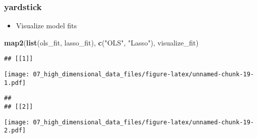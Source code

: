 \documentclass[
]{book}
\newenvironment{Shaded}{\begin{snugshade}}{\end{snugshade}}
\newcommand{\KeywordTok}[1]{\textcolor[rgb]{0.13,0.29,0.53}{\textbf{#1}}}
\newcommand{\NormalTok}[1]{#1}
\newcommand{\StringTok}[1]{\textcolor[rgb]{0.31,0.60,0.02}{#1}}
\providecommand{\tightlist}{%
  \setlength{\itemsep}{0pt}\setlength{\parskip}{0pt}}
\begin{document}
\hypertarget{yardstick}{%
\subsubsection{yardstick}\label{yardstick}}

\begin{itemize}
\tightlist
\item
  Visualize model fits
\end{itemize}

\begin{Shaded}
\begin{Highlighting}[]
\KeywordTok{map2}\NormalTok{(}\KeywordTok{list}\NormalTok{(ols\_fit, lasso\_fit), }\KeywordTok{c}\NormalTok{(}\StringTok{"OLS"}\NormalTok{, }\StringTok{"Lasso"}\NormalTok{), visualize\_fit)}
\end{Highlighting}
\end{Shaded}

\begin{verbatim}
## [[1]]
\end{verbatim}

\texttt{[image: 07\_high\_dimensional\_data\_files/figure-latex/unnamed-chunk-19-1.pdf]}

\begin{verbatim}
## 
## [[2]]
\end{verbatim}

\texttt{[image: 07\_high\_dimensional\_data\_files/figure-latex/unnamed-chunk-19-2.pdf]}
\end{document}
